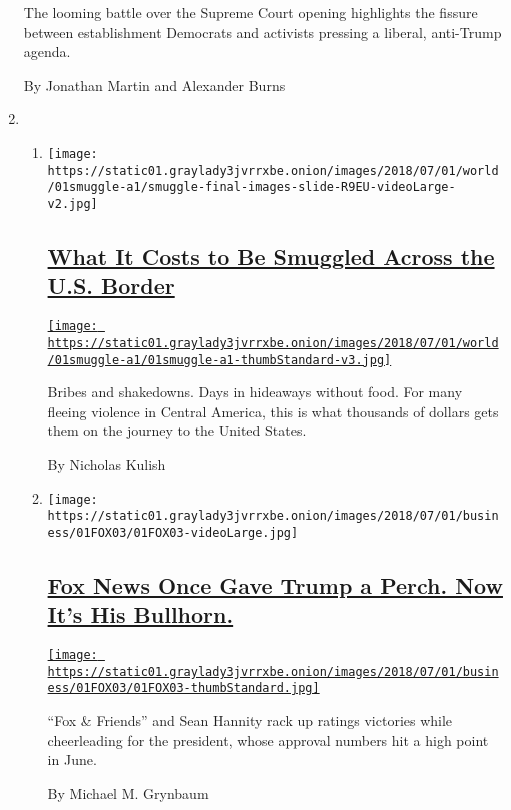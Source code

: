 \begin{enumerate}
  The looming battle over the Supreme Court opening highlights the
  fissure between establishment Democrats and activists pressing a
  liberal, anti-Trump agenda.

  By Jonathan Martin and Alexander Burns
\item
  \begin{enumerate}
  \def\labelenumii{\arabic{enumii}.}
  \item
    \texttt{[image: https://static01.graylady3jvrrxbe.onion/images/2018/07/01/world/01smuggle-a1/smuggle-final-images-slide-R9EU-videoLarge-v2.jpg]}

    \hypertarget{what-it-costs-to-be-smuggled-across-the-us-border}{%
    \subsection{\texorpdfstring{\href{/interactive/2018/06/30/world/smuggling-illegal-immigration-costs.html}{What
    It Costs to Be Smuggled Across the U.S.
    Border}}{What It Costs to Be Smuggled Across the U.S. Border}}\label{what-it-costs-to-be-smuggled-across-the-us-border}}

    \href{/interactive/2018/06/30/world/smuggling-illegal-immigration-costs.html}{\texttt{[image: https://static01.graylady3jvrrxbe.onion/images/2018/07/01/world/01smuggle-a1/01smuggle-a1-thumbStandard-v3.jpg]}}

    Bribes and shakedowns. Days in hideaways without food. For many
    fleeing violence in Central America, this is what thousands of
    dollars gets them on the journey to the United States.

    By Nicholas Kulish
  \item
    \texttt{[image: https://static01.graylady3jvrrxbe.onion/images/2018/07/01/business/01FOX03/01FOX03-videoLarge.jpg]}

    \hypertarget{fox-news-once-gave-trump-a-perch-now-its-his-bullhorn}{%
    \subsection{\texorpdfstring{\href{/2018/07/01/business/media/fox-news-trump-bill-shine.html}{Fox
    News Once Gave Trump a Perch. Now It's His
    Bullhorn.}}{Fox News Once Gave Trump a Perch. Now It's His Bullhorn.}}\label{fox-news-once-gave-trump-a-perch-now-its-his-bullhorn}}

    \href{/2018/07/01/business/media/fox-news-trump-bill-shine.html}{\texttt{[image: https://static01.graylady3jvrrxbe.onion/images/2018/07/01/business/01FOX03/01FOX03-thumbStandard.jpg]}}

    ``Fox \& Friends'' and Sean Hannity rack up ratings victories while
    cheerleading for the president, whose approval numbers hit a high
    point in June.

    By Michael M. Grynbaum
  \end{enumerate}
\end{enumerate}


